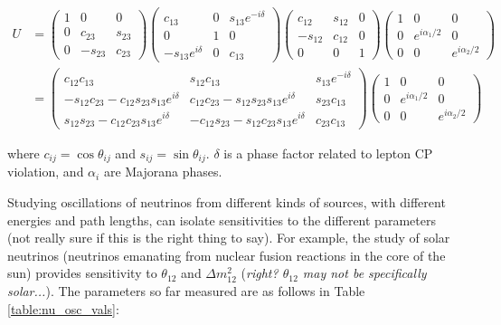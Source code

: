\begin{equation}
\begin{aligned}
U &= \begin{pmatrix}
1 & 0 & 0 \\
0 & c_{23} & s_{23} \\
0 & -s_{23} & c_{23} \end{pmatrix}
\begin{pmatrix}
c_{13} & 0 & s_{13} e^{-i \delta} \\
0 & 1 & 0 \\
-s_{13} e^{i \delta} & 0 & c_{13} \end{pmatrix}
\begin{pmatrix}
c_{12} & s_{12} & 0 \\
-s_{12} & c_{12} & 0 \\
0 & 0 & 1 \end{pmatrix}
\begin{pmatrix}
1 & 0 & 0 \\
0 & e^{i \alpha_{1}/2} & 0 \\
0 & 0 & e^{i \alpha_{2}/2} \end{pmatrix} \\
& = \begin{pmatrix}
c_{12} c_{13} & s_{12} c_{13} & s_{13} e^{-i \delta} \\
-s_{12} c_{23} - c_{12} s_{23} s_{13} e^{i \delta} & c_{12} c_{23} - s_{12} s_{23} s_{13} e^{i \delta} & s_{23} c_{13} \\
s_{12} s_{23} - c_{12} c_{23} s_{13} e^{i \delta} & -c_{12} s_{23} - s_{12} c_{23} s_{13} e^{i \delta} & c_{23} c_{13} \end{pmatrix}
\begin{pmatrix}
1 & 0 & 0 \\
0 & e^{i \alpha_{1}/2} & 0 \\
0 & 0 & e^{i \alpha_{2}/2} \end{pmatrix}
\end{aligned}
\label{eqn:umatrix}
\end{equation}

\noindent
where $c_{ij} = \cos \theta_{ij}$ and $s_{ij} = \sin \theta_{ij}$.  $\delta$ is a phase factor related to lepton CP violation, and $\alpha_{i}$ are Majorana phases.

Studying oscillations of neutrinos from different kinds of sources, with different energies and path lengths, can isolate sensitivities to the different parameters {\color{gray}(not really sure if this is the right thing to say)}.  For example, the study of solar neutrinos (neutrinos emanating from nuclear fusion reactions in the core of the sun) provides sensitivity to $\theta_{12}$ and $\Delta m_{12}^{2}$ {\color{gray}(\emph{right? $\theta_{12}$ may not be specifically solar...})}.  The parameters so far measured are as follows in Table  \ref{table:nu_osc_vals}:

